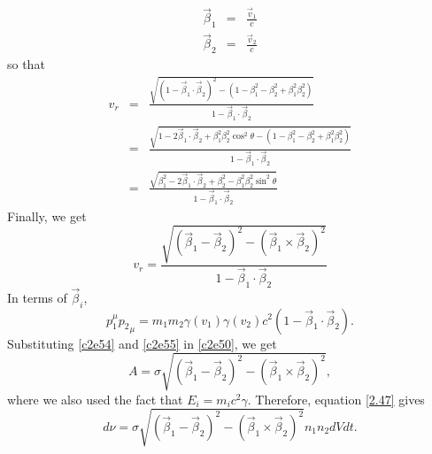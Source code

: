 \begin{enumerate}
\begin{eqnarray}
\vec{\beta}_1 &=& \frac{\vec{v}_1}{c} \label{c2e52} \\
\vec{\beta}_2 &=& \frac{\vec{v}_2}{c} \label{c2e53}
\end{eqnarray}
so that
\begin{eqnarray*}
v_r &=& \frac{\sqrt{(1 - \vec{\beta}_1\cdot\vec{\beta}_2)^2 - (1 - \beta_1^2 - \beta_2^2 + \beta_1^2\beta_2^2)}}
{1 - \vec{\beta}_1\cdot\vec{\beta}_2} \\
 &=& \frac{\sqrt{1 - 2\vec{\beta}_1\cdot\vec{\beta}_2 + \beta_1^2\beta_2^2\cos^2\theta - 
 (1 - \beta_1^2 - \beta_2^2 + \beta_1^2\beta_2^2)}}{1 - \vec{\beta}_1\cdot\vec{\beta}_2} \\
 &=& \frac{\sqrt{\beta_1^2 - 2\vec{\beta}_1\cdot\vec{\beta}_2 + \beta_2^2 - \beta_1^2\beta_2^2\sin^2\theta }}
 {1 - \vec{\beta}_1\cdot\vec{\beta}_2}
\end{eqnarray*}
Finally, we get
\begin{equation}\label{c2e54}
v_r = \frac{\sqrt{(\vec{\beta}_1 - \vec{\beta}_2)^2 - (\vec{\beta}_1 \times \vec{\beta}_2)^2}}
  {1 - \vec{\beta}_1\cdot\vec{\beta}_2}
\end{equation}
In terms of $\vec{\beta}_i$,
\begin{equation}\label{c2e55}
p_1^\mu {p_2}_\mu = m_1m_2\gamma(v_1)\gamma(v_2)c^2\left(1 - \vec{\beta}_1\cdot\vec{\beta}_2\right).
\end{equation}
Substituting \eqref{c2e54} and \eqref{c2e55} in \eqref{c2e50}, we get
\begin{equation}\label{c2e56}
A = \sigma \sqrt{(\vec{\beta}_1 - \vec{\beta}_2)^2 - (\vec{\beta}_1 \times \vec{\beta}_2)^2},
\end{equation}
where we also used the fact that $E_i = m_ic^2\gamma$. Therefore, equation \eqref{2.47} gives
\begin{equation}\label{c2e57}
d\nu = \sigma \sqrt{(\vec{\beta}_1 - \vec{\beta}_2)^2 - (\vec{\beta}_1 \times \vec{\beta}_2)^2}
	n_1n_2dVdt.
\end{equation}


\end{enumerate}
